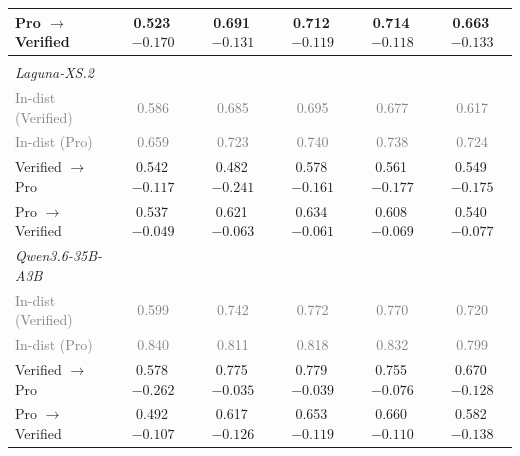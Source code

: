 \begin{table}[t]
\begin{tabular}{lccccc}
\qquad{}Pro $\rightarrow$ Verified & 0.523\,{\scriptsize \textcolor{red!70!black}{$-0.170$}} & 0.691\,{\scriptsize \textcolor{red!70!black}{$-0.131$}} & 0.712\,{\scriptsize \textcolor{red!70!black}{$-0.119$}} & 0.714\,{\scriptsize \textcolor{red!70!black}{$-0.118$}} & 0.663\,{\scriptsize \textcolor{red!70!black}{$-0.133$}}  \\
\midrule
\multicolumn{6}{l}{\textit{\Regressions{}}} \\
\quad{}\textit{Laguna-XS.2} \\
\qquad{}\textcolor{gray}{\small In-dist (Verified)} & \textcolor{gray}{\small 0.586} & \textcolor{gray}{\small 0.685} & \textcolor{gray}{\small 0.695} & \textcolor{gray}{\small 0.677} & \textcolor{gray}{\small 0.617} \\
\qquad{}\textcolor{gray}{\small In-dist (Pro)} & \textcolor{gray}{\small 0.659} & \textcolor{gray}{\small 0.723} & \textcolor{gray}{\small 0.740} & \textcolor{gray}{\small 0.738} & \textcolor{gray}{\small 0.724} \\
\qquad{}Verified $\rightarrow$ Pro & 0.542\,{\scriptsize \textcolor{red!70!black}{$-0.117$}} & 0.482\,{\scriptsize \textcolor{red!70!black}{$-0.241$}} & 0.578\,{\scriptsize \textcolor{red!70!black}{$-0.161$}} & 0.561\,{\scriptsize \textcolor{red!70!black}{$-0.177$}} & 0.549\,{\scriptsize \textcolor{red!70!black}{$-0.175$}}  \\
\qquad{}Pro $\rightarrow$ Verified & 0.537\,{\scriptsize \textcolor{red!70!black}{$-0.049$}} & 0.621\,{\scriptsize \textcolor{red!70!black}{$-0.063$}} & 0.634\,{\scriptsize \textcolor{red!70!black}{$-0.061$}} & 0.608\,{\scriptsize \textcolor{red!70!black}{$-0.069$}} & 0.540\,{\scriptsize \textcolor{red!70!black}{$-0.077$}}  \\
\quad{}\textit{Qwen3.6-35B-A3B} \\
\qquad{}\textcolor{gray}{\small In-dist (Verified)} & \textcolor{gray}{\small 0.599} & \textcolor{gray}{\small 0.742} & \textcolor{gray}{\small 0.772} & \textcolor{gray}{\small 0.770} & \textcolor{gray}{\small 0.720} \\
\qquad{}\textcolor{gray}{\small In-dist (Pro)} & \textcolor{gray}{\small 0.840} & \textcolor{gray}{\small 0.811} & \textcolor{gray}{\small 0.818} & \textcolor{gray}{\small 0.832} & \textcolor{gray}{\small 0.799} \\
\qquad{}Verified $\rightarrow$ Pro & 0.578\,{\scriptsize \textcolor{red!70!black}{$-0.262$}} & 0.775\,{\scriptsize \textcolor{red!70!black}{$-0.035$}} & 0.779\,{\scriptsize \textcolor{red!70!black}{$-0.039$}} & 0.755\,{\scriptsize \textcolor{red!70!black}{$-0.076$}} & 0.670\,{\scriptsize \textcolor{red!70!black}{$-0.128$}}  \\
\qquad{}Pro $\rightarrow$ Verified & 0.492\,{\scriptsize \textcolor{red!70!black}{$-0.107$}} & 0.617\,{\scriptsize \textcolor{red!70!black}{$-0.126$}} & 0.653\,{\scriptsize \textcolor{red!70!black}{$-0.119$}} & 0.660\,{\scriptsize \textcolor{red!70!black}{$-0.110$}} & 0.582\,{\scriptsize \textcolor{red!70!black}{$-0.138$}}  \\
\bottomrule
\end{tabular}
\end{table}